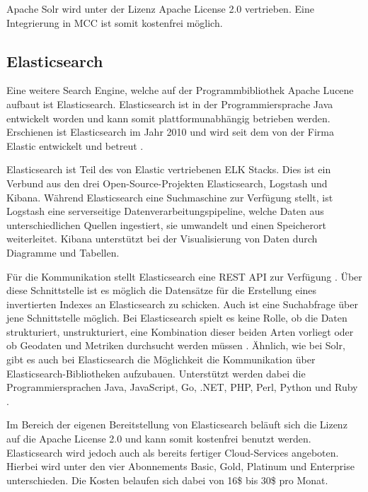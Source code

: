 Apache Solr wird unter der Lizenz \glqq Apache License 2.0\grqq{} vertrieben. Eine Integrierung in MCC ist somit kostenfrei möglich.

\subsection{Elasticsearch\label{subsec4.2.4:Unterunterpunkt-4}}

Eine weitere Search Engine, welche auf der Programmbibliothek \glqq Apache Lucene\grqq{} aufbaut ist Elasticsearch. Elasticsearch ist in der Programmiersprache Java entwickelt worden und kann somit plattformunabhängig betrieben werden. Erschienen ist Elasticsearch im Jahr 2010 und wird seit dem von der Firma Elastic entwickelt und betreut \cite{Elastic.2021}.

Elasticsearch ist Teil des von Elastic vertriebenen \glqq ELK Stacks\grqq{}. Dies ist ein Verbund aus den drei Open-Source-Projekten \glqq Elasticsearch\grqq{}, \glqq Logstash\grqq{} und \glqq Kibana\grqq{}. Während Elasticsearch eine Suchmaschine zur Verfügung stellt, ist Logstash eine serverseitige Datenverarbeitungspipeline, welche Daten aus unterschiedlichen Quellen ingestiert, sie umwandelt und einen Speicherort weiterleitet. Kibana unterstützt bei der Visualisierung von Daten durch Diagramme und Tabellen.

Für die Kommunikation stellt Elasticsearch eine REST API zur Verfügung \cite{Elasticsearch.2021}. Über diese Schnittstelle ist es möglich die Datensätze für die Erstellung eines invertierten Indexes an Elasticsearch zu schicken. Auch ist eine Suchabfrage über jene Schnittstelle möglich. Bei Elasticsearch spielt es keine Rolle, ob die Daten strukturiert, unstrukturiert, eine Kombination dieser beiden Arten vorliegt oder ob Geodaten und Metriken durchsucht werden müssen \cite{Elasticsearch.2021}. Ähnlich, wie bei Solr, gibt es auch bei Elasticsearch die Möglichkeit die Kommunikation über Elasticsearch-Bibliotheken aufzubauen. Unterstützt werden dabei die Programmiersprachen Java, JavaScript, Go, .NET, PHP, Perl, Python und Ruby \cite{Elasticsearch.2021}.

Im Bereich der eigenen Bereitstellung von Elasticsearch beläuft sich die Lizenz auf die \glqq Apache License 2.0\grqq{} und kann somit kostenfrei benutzt werden. Elasticsearch wird jedoch auch als bereits fertiger Cloud-Services angeboten. Hierbei wird unter den vier Abonnements \glqq Basic\grqq{}, \glqq Gold\grqq{}, \glqq Platinum\grqq{} und \glqq Enterprise\grqq{} unterschieden. Die Kosten belaufen sich dabei von 16\$ bis 30\$ pro Monat.

